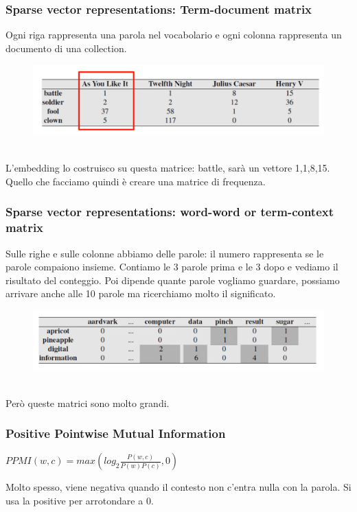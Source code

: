 \newpage

\subsubsection{Sparse vector representations: Term-document matrix}
Ogni riga rappresenta una parola nel vocabolario e ogni colonna rappresenta un documento di una collection. 
\\
\begin{figure}[th]
    \centering
    \includegraphics[scale=0.5]{Text Analysis/img/termdocument.png}
\end{figure}
\\
L'embedding lo costruisco su questa matrice: battle, sarà un vettore 1,1,8,15. Quello che facciamo quindi è creare una matrice di frequenza. 

\subsubsection{Sparse vector representations: word-word or term-context matrix}
Sulle righe e sulle colonne abbiamo delle parole: il numero rappresenta se le parole compaiono insieme. Contiamo le 3 parole prima e le 3 dopo e vediamo il risultato del conteggio. Poi dipende quante parole vogliamo guardare, possiamo arrivare anche alle 10 parole ma ricerchiamo molto il significato. 
\\
\begin{figure}[th]
    \centering
    \includegraphics[scale=0.5]{Text Analysis/img/wordword.png}
\end{figure}
\\
Però queste matrici sono molto grandi.

\subsubsection{Positive Pointwise Mutual Information}
\begin{center}
    \begin{math}
        PPMI(w,c) = max(log_2 \frac{P(w,c)}{P(w) P(c)}, 0)
    \end{math}
\end{center}
Molto spesso, viene negativa quando il contesto non c'entra nulla con la parola. Si usa la positive per arrotondare a 0. 

